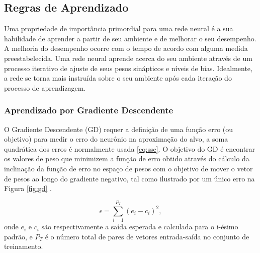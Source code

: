 \subsection{Regras de Aprendizado}

Uma propriedade de importância primordial para uma rede neural é a sua habilidade de aprender a partir de seu ambiente e de melhorar o seu desempenho. A melhoria do desempenho ocorre com o tempo de acordo com alguma medida preestabelecida. Uma rede neural aprende acerca do seu ambiente através de um processo iterativo de ajuste de seus pesos sinápticos e níveis de bias. Idealmente, a rede se torna mais instruída sobre o seu ambiente após cada iteração do processo de aprendizagem.

\subsubsection{Aprendizado por Gradiente Descendente}

O Gradiente Descendente (GD) requer a definição de uma função erro (ou objetivo) para medir o erro do neurônio na aproximação do alvo, a soma quadrática dos erros é normalmente usada \ref{eq:sse}. O objetivo do GD é encontrar os valores de peso que minimizem a função de erro obtido através do cálculo da inclinação da função de erro \label{symbol:funcaoerroGD} no espaço de pesos com o objetivo de mover o vetor de pesos ao longo do gradiente negativo, tal como ilustrado por um único erro na Figura \ref{fig:gd} \cite{engelbrecht2007computational}.

\begin{equation}
\label{eq:sse}
\epsilon = \sum\limits_{i=1}^{P_T}(e_i - c_i)^2, 
\end{equation}
onde $e_i$ e $c_i$ são respectivamente a saída esperada e calculada para o i-ésimo padrão, e $P_T$ é o número total de pares de vetores entrada-saída no conjunto de treinamento.

